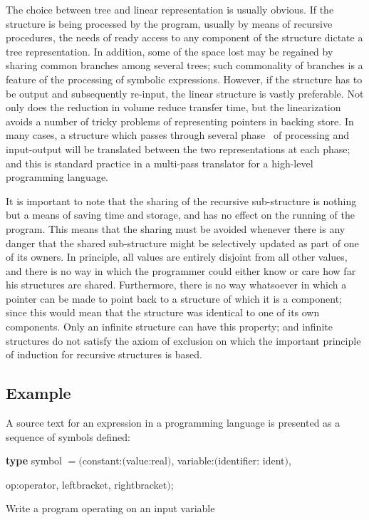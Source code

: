 The choice between tree and linear representation is usually obvious. If the structure is being processed by the program, usually by means of recursive procedures, the needs of ready access to any component of the structure dictate a tree representation. In addition, some of the space lost may be regained by sharing common branches among several trees; such commonality of branches is a feature of the processing of symbolic expressions. However, if the structure has to be output and subsequently re-input, the linear structure is vastly preferable. Not only does the reduction in volume reduce transfer time, but the linearization avoids a number of tricky problems of representing pointers in backing store. In many cases, a structure which passes through several phase~ of processing and input-output will be translated between the two representations at each phase; and this is standard practice in a multi-pass translator for a high-level programming language.

It is important to note that the sharing of the recursive sub-structure is nothing but a means of saving time and storage, and has no effect on the running of the program. This means that the sharing must be avoided whenever there is any danger that the shared sub-structure might be selectively updated as part of one of its owners. In principle, all values are entirely disjoint from all other values, and there is no way in which the programmer could either know or care how far his structures are shared. Furthermore, there is no way whatsoever in which a pointer can be made to point back to a structure of which it is a component; since this would mean that the structure was identical to one of its own components. Only an infinite structure can have this property; and infinite structures do not satisfy the axiom of exclusion on which the important principle of induction for recursive structures is based.

\subsection{Example}
\label{sec:example-9-2}

A source text for an expression in a programming language is presented as a sequence of symbols defined:

\quad \textbf{type} symbol $= ($constant:$($value:real$)$, variable:$($identifier: ident$)$,

\tabto*{9.2em}op:operator, leftbracket, rightbracket$)$;

Write a program operating on an input variable

